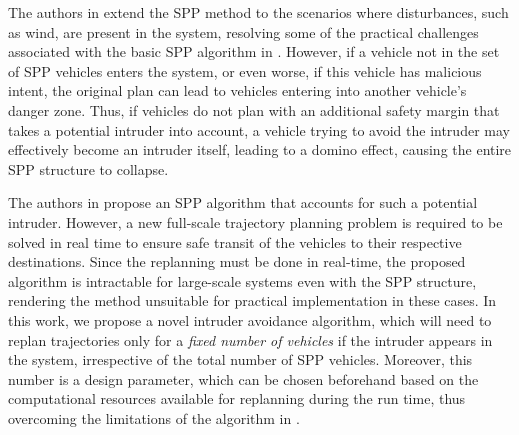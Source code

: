 The authors in \cite{Bansal2017} extend the SPP method to the scenarios where disturbances, such as wind, are present in the system, resolving some of the practical challenges associated with the basic SPP algorithm in \cite{Chen15c}. However, if a vehicle not in the set of SPP vehicles enters the system, or even worse, if this vehicle has malicious intent, the original plan can lead to vehicles entering into another vehicle’s danger zone. Thus, if vehicles do not plan with an additional safety margin that takes a potential intruder into account, a vehicle trying to avoid the intruder may effectively become an intruder itself, leading to a domino effect, causing the entire SPP structure to collapse. 

The authors in \cite{chen2016robust} propose an SPP algorithm that accounts for such a potential intruder. However, a new full-scale trajectory planning problem is required to be solved in real time to ensure safe transit of the vehicles to their respective destinations. Since the replanning must be done in real-time, the proposed algorithm is intractable for large-scale systems even with the SPP structure, rendering the method unsuitable for practical implementation in these cases. In this work, we propose a novel intruder avoidance algorithm, which will need to replan trajectories only for a \textit{fixed number of vehicles} if the intruder appears in the system, irrespective of the total number of SPP vehicles. Moreover, this number is a design parameter, which can be chosen beforehand based on the computational resources available for replanning during the run time, thus overcoming the limitations of the algorithm in \cite{chen2016robust}. 

